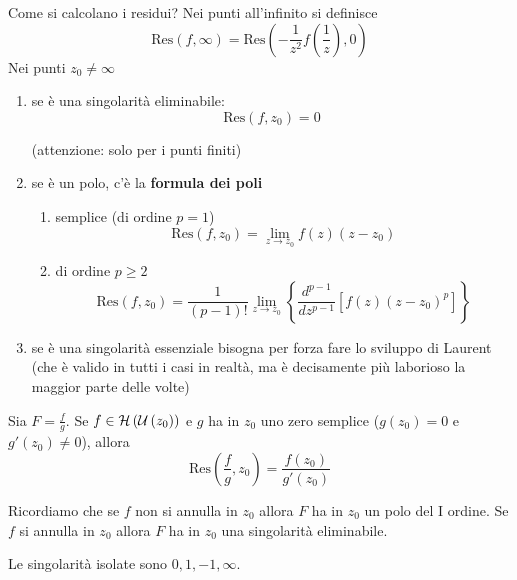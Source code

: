 \begin{rem}
Come si calcolano i residui?
Nei punti all'infinito si definisce
\begin{equation*}
\mathrm{Res}\left( f,\infty \right) =\mathrm{Res}\left( -\frac{1}{z^{2}} f\left(\frac{1}{z}\right) ,0\right)
\end{equation*}
Nei punti $z_{0} \neq \infty $
\begin{enumerate}
\item se è una singolarità eliminabile:\begin{equation*}
\mathrm{Res}\left( f,z_{0}\right) =0
\end{equation*}

(attenzione: solo per i punti finiti)
\item se è un polo, c'è la \textbf{formula dei poli}
\begin{enumerate}
\item semplice (di ordine $p=1$)\begin{equation*}
\mathrm{Res}\left( f,z_{0}\right) =\lim\limits _{z\rightarrow z_{0}} f\left( z\right)\left( z-z_{0}\right)
\end{equation*}
\item di ordine $p\geqslant 2$\begin{equation*}
\mathrm{Res}\left( f,z_{0}\right) =\frac{1}{\left( p-1\right) !}\lim\limits _{z\rightarrow z_{0}}\left\{\frac{d^{p-1}}{dz^{p-1}}\left[ f\left( z\right)\left( z-z_{0}\right)^{p}\right]\right\}
\end{equation*}
\end{enumerate}
\item se è una singolarità essenziale bisogna per forza fare lo sviluppo di Laurent (che è valido in tutti i casi in realtà, ma è decisamente più laborioso la maggior parte delle volte)
\end{enumerate}
\end{rem}
\begin{thm}
Sia $F=\frac{f}{g}$. Se $f\in \mathcal{H} \left(\mathcal{U} \left( z_{0}\right)\right)$ e $g$ ha in $z_{0}$ uno zero semplice ($g\left( z_{0}\right) =0$ e $g'\left( z_{0}\right) \neq 0$), allora\begin{equation*}
\mathrm{Res}\left(\frac{f}{g} ,z_{0}\right) =\frac{f\left( z_{0}\right)}{g'\left( z_{0}\right)}
\end{equation*}

Ricordiamo che se $f$ non si annulla in $z_{0}$ allora $F$ ha in $z_{0}$ un polo del I ordine. Se $f$ si annulla in $z_{0}$ allora $F$ ha in $z_{0}$ una singolarità eliminabile.
\end{thm}
Le singolarità isolate sono $0,1,-1,\infty $.

